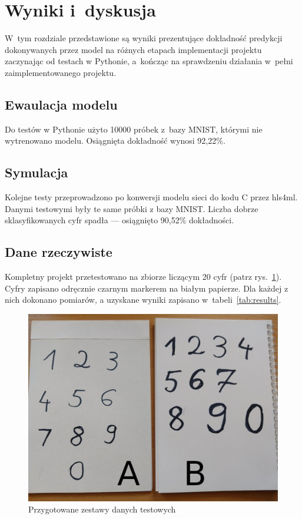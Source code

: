 \documentclass[12pt, oneside, a4paper]{article}
\def\CPP{{C\nolinebreak[4]\hspace{-.05em}\raisebox{.4ex}{\tiny\bf ++}}}
\begin{document}
\newpage
\section{Wyniki i~dyskusja}\label{sec:Wyniki i dyskusja}
W~tym rozdziale przedstawione są wyniki prezentujące dokładność
predykcji dokonywanych przez model na różnych etapach implementacji
projektu zaczynając od testach w Pythonie, a~kończąc na sprawdzeniu
działania w~pełni zaimplementowanego projektu.

\subsection{Ewaulacja modelu}\label{sec:Ewaulacja modelu}
Do testów w Pythonie użyto 10000 próbek z~bazy MNIST, którymi nie
wytrenowano modelu. Osiągnięta dokładność wynosi 92,22\%. 

\subsection{Symulacja}\label{sec:Symulacja}
Kolejne testy przeprowadzono po konwersji modelu sieci do kodu \CPP{}
przez hls4ml. Danymi testowymi były te same próbki z bazy MNIST.
Liczba dobrze sklasyfikowanych cyfr spadła --- osiągnięto 90,52\%
dokładności.

\subsection{Dane rzeczywiste}\label{sec:Dane rzeczywiste}
Kompletny projekt przetestowano na zbiorze liczącym 20 cyfr (patrz
rys.~\ref{fig:test_data}). Cyfry
zapisano odręcznie czarnym markerem na białym papierze. Dla każdej z nich
dokonano pomiarów, a uzyskane wyniki zapisano w~tabeli~\ref{tab:results}.

\begin{figure}[h]
  \centering
  \includegraphics[width=0.9\linewidth]{figures/test_data.jpg}
  \caption{Przygotowane zestawy danych testowych}\label{fig:test_data}
\end{figure}
\end{document}
